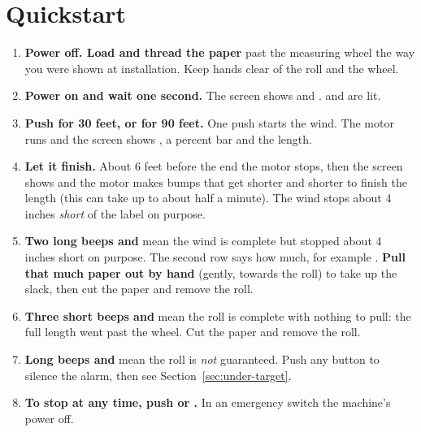\chapter{Quickstart}\label{ch:quickstart}

\begin{tcolorbox}[enhanced,colback=white,colframe=black,boxrule=1.6pt,arc=0pt,
  fonttitle=\bfseries\Large,coltitle=white,colbacktitle=black,
  title={Wind one roll in eight steps}]
\begin{enumerate}[leftmargin=2em,itemsep=0.15em]
  \item \textbf{Power off. Load and thread the paper} past the measuring
        wheel the way you were shown at installation. Keep hands clear of
        the roll and the wheel.
  \item \textbf{Power on and wait one second.} The screen shows
         and .
         and  are lit.
  \item \textbf{Push  for 30 feet, or  for 90 feet.}
        One push starts the wind. The motor runs and the screen shows
        , a percent bar and the length.
  \item \textbf{Let it finish.} About 6 feet before the end the motor
        stops, then the screen shows  and the motor makes
        bumps that get shorter and shorter to finish the length (this can
        take up to about half a minute). The wind stops about 4 inches
        \emph{short} of the label on purpose.
  \item \textbf{Two long beeps and } mean the wind
        is complete but stopped about 4 inches short on purpose. The second
        row says how much, for example .
        \textbf{Pull that much paper out by hand} (gently, towards the roll)
        to take up the slack, then cut the paper and remove the roll.
  \item \textbf{Three short beeps and } mean the roll is complete
        with nothing to pull: the full length went past the wheel.
        Cut the paper and remove the roll.
  \item \textbf{Long beeps and } mean the roll is
        \emph{not} guaranteed. Push any button to silence the alarm, then
        see Section~\ref{sec:under-target}.
  \item \textbf{To stop at any time, push  or .}
        In an emergency switch the machine's power off.
\end{enumerate}
\end{tcolorbox}

